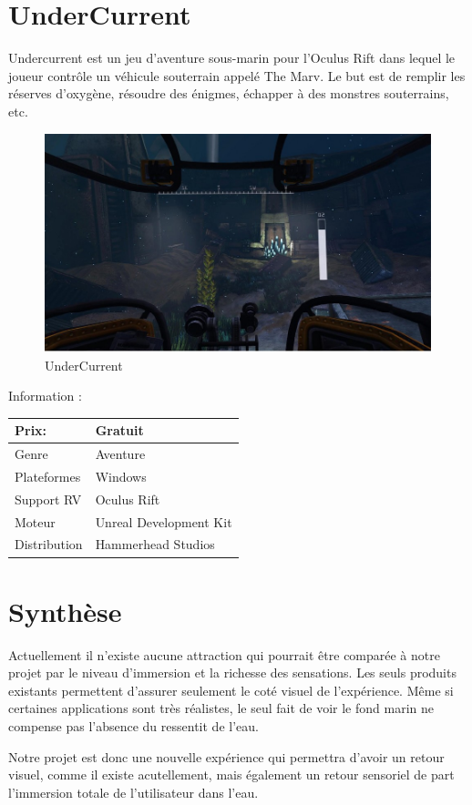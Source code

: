 \section{UnderCurrent}

Undercurrent est un jeu d'aventure sous-marin pour l'Oculus Rift dans lequel le joueur contrôle un véhicule souterrain appelé The Marv. Le but est de remplir les réserves d'oxygène, résoudre des énigmes, échapper à des monstres souterrains, etc.

\begin{figure}[!ht]
	\center	
	\includegraphics[scale=0.4]{image/under.jpg}
	\caption{UnderCurrent}
\end{figure}


Information \cite{5}:
\begin{table}[h]
	\center	
\begin{tabular}{|l|l|}
\hline
 Prix:  & Gratuit \\ \hline
Genre  &  Aventure \\ \hline
 Plateformes  &  Windows \\ \hline
 Support RV  &  Oculus Rift \\ \hline
 Moteur  &  Unreal Development Kit \\ \hline
 Distribution  &  Hammerhead Studios  \\ \hline
\end{tabular}
\end{table}

\newpage

\section{Synthèse}

Actuellement il n'existe aucune attraction qui pourrait être comparée à notre projet par le niveau d'immersion et la richesse des sensations. Les seuls produits existants permettent d’assurer seulement le coté visuel de l’expérience. Même si certaines applications sont très réalistes, le seul fait de voir le fond marin ne compense pas l’absence du ressentit de l'eau. 

Notre projet est donc une nouvelle expérience qui permettra d'avoir un retour visuel, comme il existe acutellement, mais également un retour sensoriel de part l'immersion totale de l'utilisateur dans l'eau.
